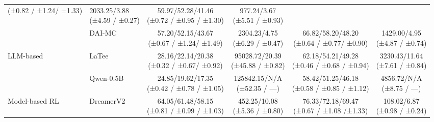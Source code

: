 \documentclass{article} %
\newcommand{\revise}[1]{#1}
\begin{document}
\begin{table}[t]
\begin{tabular}{l l c c c c}
{\revise{{\scriptsize (±0.82 / ±1.24/ ±1.33)}}} & \makecell[c]{2033.25/3.88\\[-3pt]
\revise{{\scriptsize (±4.59 / ±0.27)}}} & \makecell[c]{59.97/52.28/41.46\\[-3pt]
\revise{{\scriptsize (±0.72 / ±0.95 / ±1.30)}}} & \makecell[c]{977.24/3.67\\[-3pt]
\revise{{\scriptsize (±5.51 / ±0.93)}}} \\
& DAI-MC   & \makecell[c]{57.20/52.15/43.67\\[-3pt]
\revise{{\scriptsize (±0.67 / ±1.24/ ±1.49)}}} & \makecell[c]{2304.23/4.75\\[-3pt]
\revise{{\scriptsize (±6.29 / ±0.47)}}} & \makecell[c]{66.82/58.20/48.20\\[-3pt]
\revise{{\scriptsize (±0.64 / ±0.77/ ±0.90)}}} & \makecell[c]{1429.00/4.95\\[-3pt]
\revise{{\scriptsize (±4.87 / ±0.74)}}} \\
\multirow{2}{*}{LLM-based}
& LaTee    & \makecell[c]{28.16/22.14/20.38\\[-3pt]
\revise{{\scriptsize (±0.32 / ±0.67/ ±0.92)}}} & \makecell[c]{95028.72/20.39\\[-3pt]
\revise{{\scriptsize (±45.88 / ±0.82)}}} & \makecell[c]{62.18/54.21/49.28\\[-3pt]
\revise{{\scriptsize (±0.46 / ±0.68 / ±0.94)}}} & \makecell[c]{3230.43/11.64\\[-3pt]
\revise{{\scriptsize (±7.61 / ±0.84)}}} \\
& \revise{Qwen-0.5B} & \makecell[c]{24.85/19.62/17.35\\[-3pt]
\revise{{\scriptsize (±0.42 / ±0.78 / ±1.05)}}} & \makecell[c]{125842.15/N/A\\[-3pt]
\revise{{\scriptsize (±52.35 / ---)}}} & \makecell[c]{58.42/51.25/46.18\\[-3pt]
\revise{{\scriptsize (±0.58 / ±0.85 / ±1.12)}}} & \makecell[c]{4856.72/N/A\\[-3pt]
\revise{{\scriptsize (±8.75 / ---)}}} \\
Model-based RL & DreamerV2 & \makecell[c]{64.05/61.48/58.15\\[-3pt]
\revise{{\scriptsize (±0.81 / ±0.99 / ±1.03)}}} & \makecell[c]{452.25/10.08\\[-3pt]
\revise{{\scriptsize (±5.36 / ±0.80)}}} & \makecell[c]{76.33/72.18/69.47\\[-3pt]
\revise{{\scriptsize (±0.67 / ±1.08 /±1.33)}}} & \makecell[c]{108.02/6.87\\[-3pt]
\revise{{\scriptsize (±0.98 / ±0.24)}}} \\

\end{tabular}
\end{table}
\end{document}

